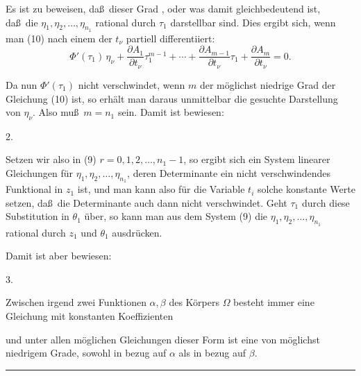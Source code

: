 Es ist zu beweisen, da\ss\ dieser Grad , oder was damit gleichbedeutend ist, da\ss\ die $\eta_1, \eta_2,
\ldots, \eta_{n_1}$ rational durch $\tau_1$ darstellbar sind. Dies
ergibt sich, wenn man (10) nach einem der $t_\nu$ partiell
differentiiert:
\[
\Phi'(\tau_1)\,\eta_\nu + \frac{\partial A_1}{\partial t_\nu}\tau_1^{m-1}
+ \cdots + \frac{\partial A_{m-1}}{\partial t_\nu}\tau_1
+ \frac{\partial A_m}{\partial t_\nu} = 0.
\]

Da nun $\Phi'(\tau_1)$ nicht verschwindet, wenn $m$ der m\"oglichst
niedrige Grad der Gleichung (10) ist, so erh\"alt man daraus
unmittelbar die gesuchte Darstellung von $\eta_\nu$. Also mu\ss\ $m =
n_1$ sein. Damit ist bewiesen:

2. 

Setzen wir also in (9) $r = 0, 1, 2, \ldots, n_1-1$, so ergibt sich ein
System linearer Gleichungen f\"ur $\eta_1, \eta_2, \ldots, \eta_{n_1}$,
deren Determinante ein nicht verschwindendes Funktional in $z_1$ ist,
und man kann also f\"ur die Variable $t_i$ solche konstante Werte
setzen, da\ss\ die Determinante auch dann nicht verschwindet. Geht
$\tau_1$ durch diese Substitution in $\theta_1$ \"uber, so kann man aus
dem System (9) die $\eta_1, \eta_2, \ldots, \eta_{n_1}$ rational durch
$z_1$ und $\theta_1$ ausdr\"ucken.

Damit ist aber bewiesen:

3. 

Zwischen irgend zwei Funktionen $\alpha, \beta$ des K\"orpers $\Omega$
besteht immer eine Gleichung mit konstanten Koeffizienten

und unter allen m\"oglichen Gleichungen dieser Form ist eine von
m\"oglichst niedrigem Grade, sowohl in bezug auf $\alpha$ als in bezug
auf $\beta$.

\begin{center}
\rule{4cm}{0.4pt}
\end{center}
